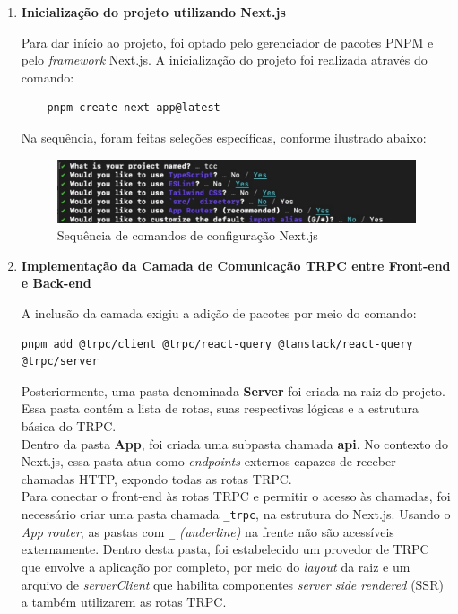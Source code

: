\begin{enumerate}

    \item\textbf{Inicialização do projeto utilizando Next.js}
    
    Para dar início ao projeto, foi optado pelo gerenciador de pacotes PNPM e pelo \textit{framework} Next.js. A inicialização do projeto foi realizada através do comando:

\begin{verbatim}
    pnpm create next-app@latest
\end{verbatim}
    
    Na sequência, foram feitas seleções específicas, conforme ilustrado abaixo:
    
\begin{figure}[!ht]
    \centering
    \includegraphics[scale=0.38]{latex/figuras/nextjs.pdf}
    \caption[Comandos de Configuração Next.js]{Sequência de comandos de configuração Next.js}
    \label{fig:enter-label}
\end{figure}

    \item\textbf{Implementação da Camada de Comunicação TRPC entre Front-end e Back-end}
    
    A inclusão da camada exigiu a adição de pacotes por meio do comando:
    
\begin{small}
\begin{verbatim}
pnpm add @trpc/client @trpc/react-query @tanstack/react-query @trpc/server
\end{verbatim}
\end{small}

    Posteriormente, uma pasta denominada \textbf{Server} foi criada na raiz do projeto. Essa pasta contém a lista de rotas, suas respectivas lógicas e a estrutura básica do TRPC.\\Dentro da pasta \textbf{App}, foi criada uma subpasta chamada \textbf{api}. No contexto do Next.js, essa pasta atua como \textit{endpoints} externos capazes de receber chamadas HTTP, expondo todas as rotas TRPC.\\ 
    Para conectar o front-end às rotas TRPC e permitir o acesso às chamadas, foi necessário criar uma pasta chamada \verb|_trpc|, na estrutura do Next.js. Usando o \textit{App router}, as pastas com \verb|_| \textit{(underline)} na frente não são acessíveis externamente. Dentro desta pasta, foi estabelecido um provedor de TRPC que envolve a aplicação por completo, por meio do \textit{layout} da raiz e um arquivo de \textit{serverClient} que habilita componentes \textit{server side rendered} (SSR) a também utilizarem as rotas TRPC.
    

\end{enumerate}
